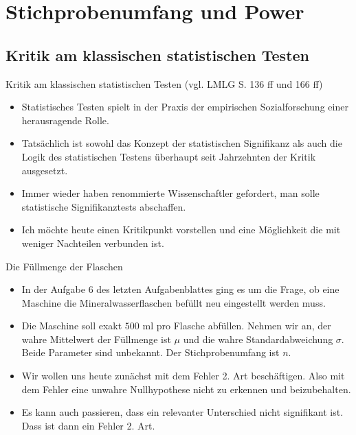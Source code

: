 \documentclass[usenames,dvipsnames,handout]{beamer}
\begin{document}
\section{Stichprobenumfang und Power}
\subsection{Kritik am klassischen statistischen Testen }
%
\begin{frame}{Kritik am klassischen statistischen Testen }
(vgl. LMLG S. 136 ff und 166 ff)
\begin{itemize}
\item{Statistisches Testen spielt in der Praxis der empirischen Sozialforschung einer herausragende Rolle.}\pause
\item{Tatsächlich ist sowohl das Konzept der statistischen Signifikanz als auch die Logik des statistischen
Testens überhaupt seit Jahrzehnten der Kritik ausgesetzt.}\pause
\item{Immer wieder haben renommierte Wissenschaftler gefordert, man solle statistische Signifikanztests
abschaffen. }\pause
\item{Ich möchte heute einen Kritikpunkt vorstellen und eine Möglichkeit die mit weniger Nachteilen
verbunden ist.}
\end{itemize}
\end{frame}
\begin{frame}{Die Füllmenge der Flaschen}
\begin{itemize}
\item{In der Aufgabe 6 des letzten Aufgabenblattes ging es um die Frage, ob eine Maschine die 
Mineralwasserflaschen befüllt  neu eingestellt werden muss.}\pause
\item{Die Maschine soll exakt
$500$ ml pro Flasche abfüllen. Nehmen wir an, der wahre Mittelwert der Füllmenge
ist $\mu$ und die wahre Standardabweichung $\sigma.$ Beide Parameter sind
unbekannt. Der Stichprobenumfang ist $n.$}\pause
\item{Wir wollen uns heute zunächst mit dem Fehler 2. Art beschäftigen.  Also mit dem Fehler eine unwahre 
Nullhypothese nicht zu erkennen und beizubehalten.}
\item{Es kann auch passieren, dass ein relevanter Unterschied nicht signifikant ist. Dass ist dann ein Fehler 2. Art.}
\end{itemize}
\end{frame}
\end{document}
